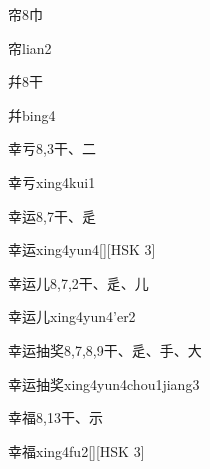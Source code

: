 \begin{entry}{帘}{8}{⼱}
  \begin{phonetics}{帘}{lian2}
  \end{phonetics}
\end{entry}

\begin{entry}{幷}{8}{⼲}
  \begin{phonetics}{幷}{bing4}
  \end{phonetics}
\end{entry}

\begin{entry}{幸亏}{8,3}{⼲、⼆}
  \begin{phonetics}{幸亏}{xing4kui1}
  \end{phonetics}
\end{entry}

\begin{entry}{幸运}{8,7}{⼲、⾡}
  \begin{phonetics}{幸运}{xing4yun4}[][HSK 3]
  \end{phonetics}
\end{entry}

\begin{entry}{幸运儿}{8,7,2}{⼲、⾡、⼉}
  \begin{phonetics}{幸运儿}{xing4yun4'er2}
  \end{phonetics}
\end{entry}

\begin{entry}{幸运抽奖}{8,7,8,9}{⼲、⾡、⼿、⼤}
  \begin{phonetics}{幸运抽奖}{xing4yun4chou1jiang3}
  \end{phonetics}
\end{entry}

\begin{entry}{幸福}{8,13}{⼲、⽰}
  \begin{phonetics}{幸福}{xing4fu2}[][HSK 3]
  \end{phonetics}
\end{entry}

